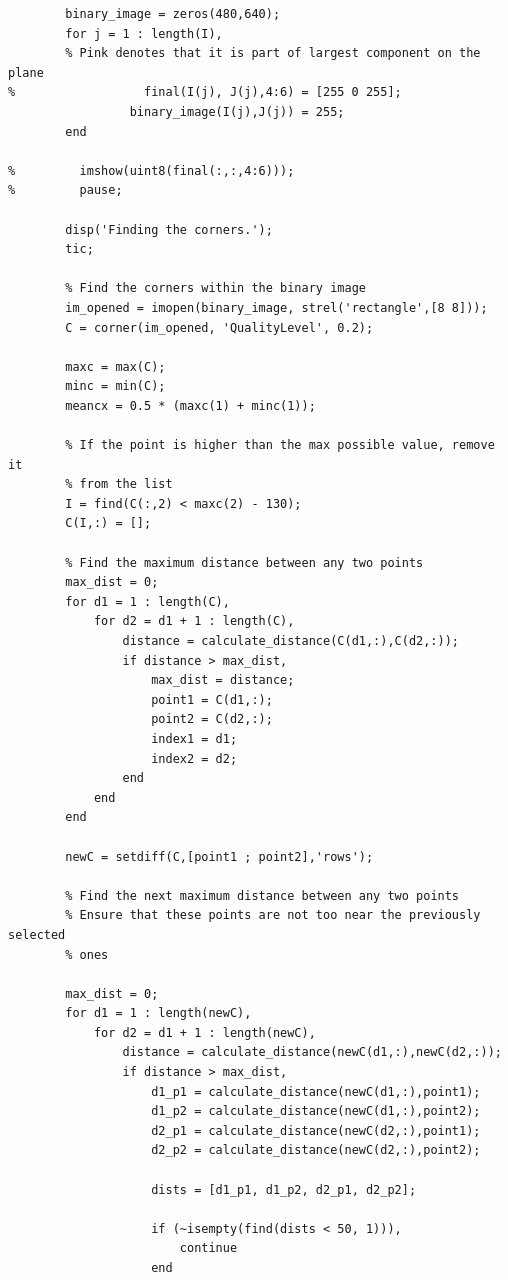 \documentclass[11pt]{article}
\begin{document}
\begin{verbatim}
        binary_image = zeros(480,640);
        for j = 1 : length(I),
        % Pink denotes that it is part of largest component on the plane
%                  final(I(j), J(j),4:6) = [255 0 255];
                 binary_image(I(j),J(j)) = 255;
        end
        
%         imshow(uint8(final(:,:,4:6)));
%         pause;
        
        disp('Finding the corners.');
        tic;
        
        % Find the corners within the binary image
        im_opened = imopen(binary_image, strel('rectangle',[8 8]));
        C = corner(im_opened, 'QualityLevel', 0.2);

        maxc = max(C);
        minc = min(C);
        meancx = 0.5 * (maxc(1) + minc(1));

        % If the point is higher than the max possible value, remove it
        % from the list
        I = find(C(:,2) < maxc(2) - 130);
        C(I,:) = [];

        % Find the maximum distance between any two points
        max_dist = 0;
        for d1 = 1 : length(C),
            for d2 = d1 + 1 : length(C),
                distance = calculate_distance(C(d1,:),C(d2,:));
                if distance > max_dist,
                    max_dist = distance;
                    point1 = C(d1,:);
                    point2 = C(d2,:);
                    index1 = d1;
                    index2 = d2;
                end
            end
        end

        newC = setdiff(C,[point1 ; point2],'rows');

        % Find the next maximum distance between any two points
        % Ensure that these points are not too near the previously selected
        % ones
        
        max_dist = 0;
        for d1 = 1 : length(newC),
            for d2 = d1 + 1 : length(newC),
                distance = calculate_distance(newC(d1,:),newC(d2,:));
                if distance > max_dist,
                    d1_p1 = calculate_distance(newC(d1,:),point1);
                    d1_p2 = calculate_distance(newC(d1,:),point2);
                    d2_p1 = calculate_distance(newC(d2,:),point1);
                    d2_p2 = calculate_distance(newC(d2,:),point2);

                    dists = [d1_p1, d1_p2, d2_p1, d2_p2];

                    if (~isempty(find(dists < 50, 1))),
                        continue
                    end


\end{verbatim}
\end{document}
